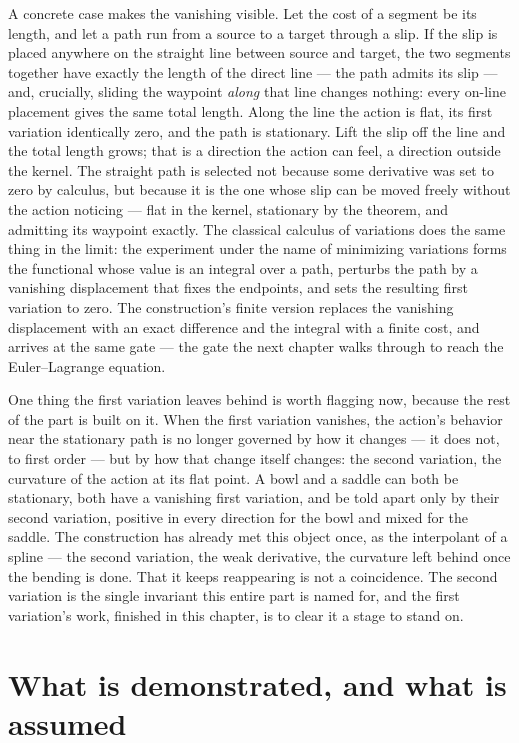 A concrete case makes the vanishing visible. Let the cost of a segment be its length, and let a path
run from a source to a target through a slip. If the slip is placed anywhere on the straight line
between source and target, the two segments together have exactly the length of the direct line ---
the path admits its slip --- and, crucially, sliding the waypoint \emph{along} that line changes
nothing: every on-line placement gives the same total length. Along the line the action is flat, its
first variation identically zero, and the path is stationary. Lift the slip off the line and the total
length grows; that is a direction the action can feel, a direction outside the kernel. The straight
path is selected not because some derivative was set to zero by calculus, but because it is the one
whose slip can be moved freely without the action noticing --- flat in the kernel, stationary by the
theorem, and admitting its waypoint exactly. The classical calculus of variations does the same thing
in the limit: the experiment under the name of minimizing variations forms the functional whose value
is an integral over a path, perturbs the path by a vanishing displacement that fixes the endpoints, and
sets the resulting first variation to zero. The construction's finite version replaces the vanishing
displacement with an exact difference and the integral with a finite cost, and arrives at the same
gate --- the gate the next chapter walks through to reach the Euler--Lagrange equation.

One thing the first variation leaves behind is worth flagging now, because the rest of the part is built
on it. When the first variation vanishes, the action's behavior near the stationary path is no longer
governed by how it changes --- it does not, to first order --- but by how that change itself changes:
the second variation, the curvature of the action at its flat point. A bowl and a saddle can both be
stationary, both have a vanishing first variation, and be told apart only by their second variation,
positive in every direction for the bowl and mixed for the saddle. The construction has already met this
object once, as the interpolant of a spline --- the second variation, the weak derivative, the curvature
left behind once the bending is done. That it keeps reappearing is not a coincidence. The second
variation is the single invariant this entire part is named for, and the first variation's work,
finished in this chapter, is to clear it a stage to stand on.

\section{What is demonstrated, and what is assumed}
\label{se:demonstrated-assumed-ch9}


